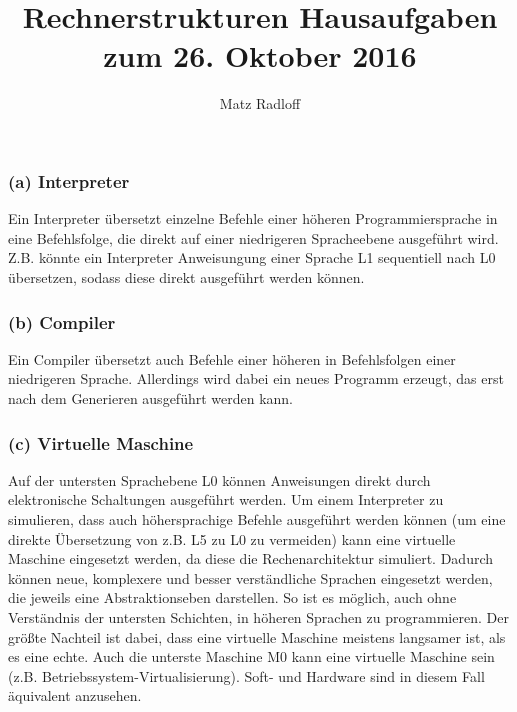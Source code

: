 \documentclass[11pt,a4paper]{article}
\title{\textbf{Rechnerstrukturen Hausaufgaben zum 26. Oktober 2016}}
\author{Matz Radloff}
\begin{document}
  \maketitle
  \date{}
  \tableofcontents
  \newpage

\section{} %

\subsection{} %

\subsubsection{(a) Interpreter} %
Ein Interpreter übersetzt einzelne Befehle einer höheren Programmiersprache in eine Befehlsfolge, die direkt auf einer niedrigeren Spracheebene ausgeführt wird. Z.B. könnte ein Interpreter Anweisungung einer Sprache L1 sequentiell nach L0 übersetzen, sodass diese direkt ausgeführt werden können.

\subsubsection{(b) Compiler} %
Ein Compiler übersetzt auch Befehle einer höheren in Befehlsfolgen einer niedrigeren Sprache. Allerdings wird dabei ein neues Programm erzeugt, das erst nach dem Generieren ausgeführt werden kann.

\subsubsection{(c) Virtuelle Maschine} %
Auf der untersten Sprachebene L0 können Anweisungen direkt durch elektronische Schaltungen ausgeführt werden. Um einem Interpreter zu simulieren, dass auch höhersprachige Befehle ausgeführt werden können (um eine direkte Übersetzung von z.B. L5 zu L0 zu vermeiden) kann eine virtuelle Maschine eingesetzt werden, da diese die Rechenarchitektur simuliert.
Dadurch können neue, komplexere und besser verständliche Sprachen eingesetzt werden, die jeweils eine Abstraktionseben darstellen. So ist es möglich, auch ohne Verständnis der untersten Schichten, in höheren Sprachen zu programmieren. Der größte Nachteil ist dabei, dass eine virtuelle Maschine meistens langsamer ist, als es eine echte. Auch die unterste Maschine M0 kann eine virtuelle Maschine sein (z.B. Betriebssystem-Virtualisierung). Soft- und Hardware sind in diesem Fall äquivalent anzusehen.
\end{document}
